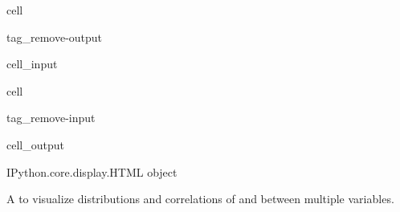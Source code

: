 \documentclass[letterpaper,10pt,english]{jupyterBook}
\begin{document}
\begin{sphinxuseclass}{cell}
\begin{sphinxuseclass}{tag_remove-output}\begin{sphinxVerbatimInput}

\begin{sphinxuseclass}{cell_input}
\begin{sphinxVerbatim}[commandchars=\\\{\}]
    
\end{sphinxVerbatim}

\end{sphinxuseclass}\end{sphinxVerbatimInput}

\end{sphinxuseclass}
\end{sphinxuseclass}
\begin{sphinxuseclass}{cell}
\begin{sphinxuseclass}{tag_remove-input}\begin{sphinxVerbatimOutput}

\begin{sphinxuseclass}{cell_output}
\begin{sphinxVerbatim}[commandchars=\\\{\}]
\PYGZlt{}IPython.core.display.HTML object\PYGZgt{}
\end{sphinxVerbatim}

\end{sphinxuseclass}\end{sphinxVerbatimOutput}

\end{sphinxuseclass}
\end{sphinxuseclass}
\sphinxAtStartPar
A  to visualize distributions and correlations of and between multiple variables.
\end{document}
